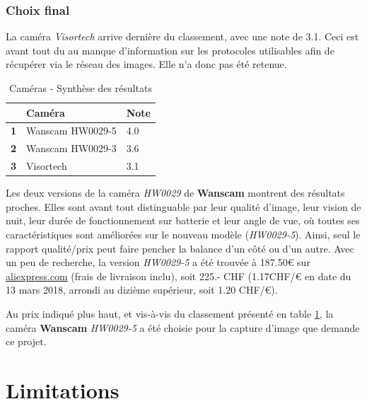\subsubsection{Choix final}

La caméra \textit{Visortech} arrive dernière du classement, avec une note de 3.1. Ceci est avant tout du au manque d'information sur les protocoles utilisables afin de récupérer via le réseau des images. Elle n'a donc pas été retenue.

\begin{table}[!h]
    \centering
    \caption{Caméras - Synthèse des résultats}
    \label{cam:synthese}
    \begin{tabular}{@{}lll@{}}
    \toprule
      & Caméra           & Note \\ \midrule
    \textbf{1} & Wanscam HW0029-5 & 4.0  \\
    \textbf{2} & Wanscam HW0029-3 & 3.6  \\
    \textbf{3} & Visortech        & 3.1  \\ \bottomrule
    \end{tabular}
\end{table}

Les deux versions de la caméra \textit{HW0029} de \textbf{Wanscam} montrent des résultats proches. Elles sont avant tout distinguable par leur qualité d'image, leur vision de nuit, leur durée de fonctionnement sur batterie et leur angle de vue, où toutes ses caractéristiques sont améliorées sur le nouveau modèle (\textit{HW0029-5}). Ainsi, seul le rapport qualité/prix peut faire pencher la balance d'un côté ou d'un autre. Avec un peu de recherche, la version \textit{HW0029-5} a été trouvée à 187.50€ sur \url{aliexpress.com}\autocite{cam:wan5-buy} (frais de livraison inclu), soit 225.- CHF (1.17CHF/€ en date du 13 mars 2018\autocite{util:cours}, arrondi au dizième supérieur, soit 1.20 CHF/€). 

Au prix indiqué plus haut, et vis-à-vis du classement présenté en table \ref{cam:synthese}, la caméra \textbf{Wanscam} \textit{HW0029-5} a été choisie pour la capture d'image que demande ce projet.

































\section{Limitations}